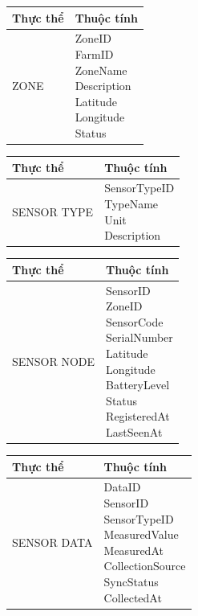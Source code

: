 \begin{longtable}{p{}p{}}
\toprule
\textbf{Thực thể} & \textbf{Thuộc tính} \\
\midrule
ZONE & \makecell[l]{ZoneID \\FarmID \\ZoneName \\Description \\Latitude \\Longitude \\Status} \\
\bottomrule
\end{longtable}


\begin{longtable}{p{}p{}}
\toprule
\textbf{Thực thể} & \textbf{Thuộc tính} \\
\midrule
SENSOR TYPE & \makecell[l]{SensorTypeID \\TypeName \\Unit \\Description} \\
\bottomrule
\end{longtable}


\begin{longtable}{p{}p{}}
\toprule
\textbf{Thực thể} & \textbf{Thuộc tính} \\
\midrule
SENSOR NODE & \makecell[l]{SensorID \\ZoneID \\SensorCode \\SerialNumber \\Latitude \\Longitude \\BatteryLevel \\Status \\RegisteredAt \\LastSeenAt} \\
\bottomrule
\end{longtable}


\begin{longtable}{p{}p{}}
\toprule
\textbf{Thực thể} & \textbf{Thuộc tính} \\
\midrule
SENSOR DATA & \makecell[l]{DataID \\SensorID \\SensorTypeID \\MeasuredValue \\MeasuredAt \\CollectionSource \\SyncStatus \\CollectedAt} \\
\bottomrule
\end{longtable}


